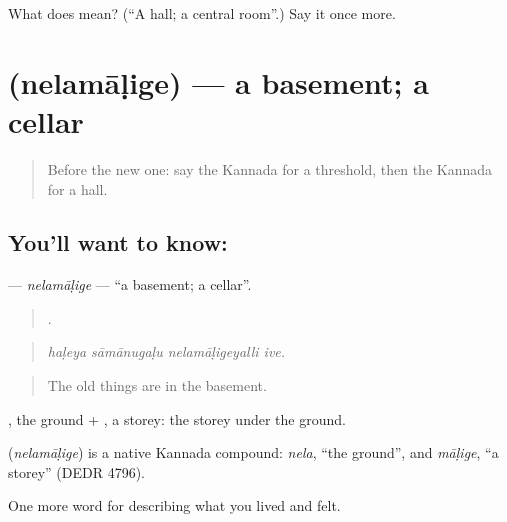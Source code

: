 \begin{tcolorbox}[breakable,colback=teal!4,colframe=teal!35!black,title={Before you move on}]
What does  mean? (\textquotedblleft{}A hall; a central room\textquotedblright{}.) Say it once more.
\end{tcolorbox}
\section[\texorpdfstring{\kn{ನೆಲಮಾಳಿಗೆ} (nelamāḷige)}{ನೆಲಮಾಳಿಗೆ (nelamāḷige)}]{ (nelamāḷige) — a basement; a cellar}

\label{lesson:KA-C542-nelamalige}



\begin{quote}
Before the new one: say the Kannada for a threshold, then the Kannada for a hall.
\end{quote}

\subsection*{You'll want to know: }
\textbf{} — \emph{nelamāḷige} — \textquotedblleft{}a basement; a cellar\textquotedblright{}.

\begin{quote}
   .
\end{quote}

\begin{quote}
\emph{haḷeya sāmānugaḷu nelamāḷigeyalli ive.}
\end{quote}

\begin{quote}
The old things are in the basement.
\end{quote}

, the ground + , a storey: the storey under the ground.

\begin{cousinweb}
\textbf{} (\emph{nelamāḷige}) is a native Kannada compound: \emph{nela}, \textquotedblleft{}the ground\textquotedblright{}, and \emph{māḷige}, \textquotedblleft{}a storey\textquotedblright{} (DEDR 4796).
\end{cousinweb}

\begin{grammarlens}[title={What you've built}]
One more word for describing what you lived and felt.
\end{grammarlens}

